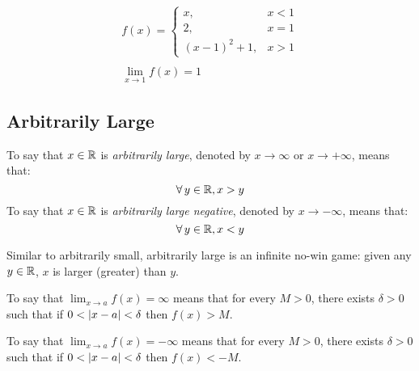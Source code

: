 \documentclass[letterpaper,12pt,fleqn]{article}
\renewcommand{\d}{\delta}
\begin{document}
\begin{example}
  \bigskip

  \begin{minipage}{3in}
    \begin{gather*}
      f(x)=\begin{cases}
      x, & x<1 \\
      2, & x=1 \\
      (x-1)^2+1, & x>1
      \end{cases} \\
      \\
      \lim_{x\to1}f(x)=1
    \end{gather*}
  \end{minipage}
  \begin{minipage}{3in}
    \begin{center}
    \end{center}
  \end{minipage}
\end{example}

\newpage

\subsection*{Arbitrarily Large}

\begin{definition}
  To say that \(x\in\mathbb{R}\) is \emph{arbitrarily large}, denoted by \(x\to\infty\) or \(x\to+\infty\), means that:
  \[\forall\,y\in\mathbb{R},x>y\]
  To say that \(x\in\mathbb{R}\) is \emph{arbitrarily large negative}, denoted by \(x\to-\infty\), means that:
  \[\forall\,y\in\mathbb{R},x<y\]
\end{definition}

Similar to arbitrarily small, arbitrarily large is an infinite no-win game: given any \(y\in\mathbb{R}\), \(x\) is larger
(greater) than \(y\).

\begin{definition}
  To say that \(\displaystyle\lim_{x\to a}f(x)=\infty\) means that for every \(M>0\), there exists \(\d>0\) such that
  if \(0<\abs{x-a}<\d\) then \(f(x)>M\).

  To say that \(\displaystyle\lim_{x\to a}f(x)=-\infty\) means that for every \(M>0\), there exists \(\d>0\) such that
  if \(0<\abs{x-a}<\d\) then \(f(x)<-M\).
\end{definition}
\end{document}
